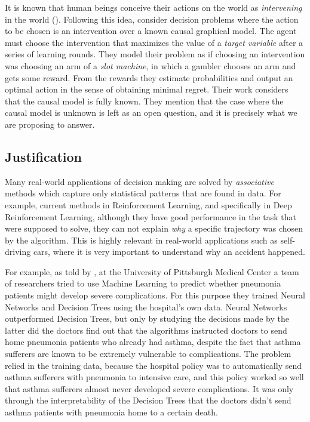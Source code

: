 \documentclass[english,letterpaper,12pt,final]{article}
\theoremstyle{definition}
\begin{document}
	It is known that human beings conceive their actions on the world as \textit{intervening} in the world (\cite{hagmayer2009decision}). Following this idea, \cite{lattimoreNIPS2016} consider decision problems where the action to be chosen is an intervention over a known causal graphical model. The agent must choose the intervention that maximizes the value of a \textit{target variable} after a series of learning rounds. They model their problem as if choosing an intervention was choosing an arm of a \textit{slot machine}, in which a gambler chooses an arm and gets some reward. From the rewards they estimate probabilities and output an optimal action in the sense of obtaining minimal regret. Their work considers that the causal model is fully known. They mention that the case where the causal model is unknown is left as an open question, and it is precisely what we are proposing to answer. 
	\subsection{Justification}
	Many real-world applications of decision making are solved by \textit{associative} methods which capture only statistical patterns that are found in data. For example, current methods in Reinforcement Learning, and specifically in Deep Reinforcement Learning, although they have good performance in the task that were supposed to solve, they can not explain \textit{why} a specific trajectory was chosen by the algorithm. This is highly relevant in real-world applications such as self-driving cars, where it is very important to understand why an accident happened. 
	
	For example, as told by \cite{bornstein2016artificial}, at the University of Pittsburgh Medical Center a team of researchers tried to use Machine Learning to predict whether pneumonia patients might develop severe complications. For this purpose they trained Neural Networks and Decision Trees using the hospital's own data. Neural Networks outperformed Decision Trees, but only by studying the decisions made by the latter did the doctors find out that the algorithms instructed doctors to send home pneumonia patients who already had asthma, despite the fact that asthma sufferers are known to be extremely vulnerable to complications. The problem relied in the training data, because the hospital policy was to automatically send asthma sufferers with pneumonia to intensive care, and this policy worked so well that asthma sufferers almost never developed severe complications. It was only through the interpretability of the Decision Trees that the doctors didn't send asthma patients with pneumonia home to a certain death. 
	
\end{document}
